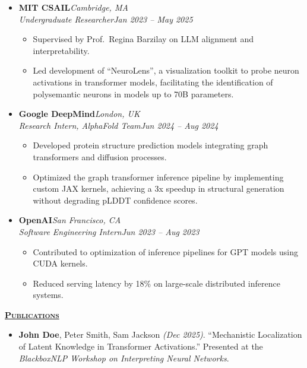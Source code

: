 \documentclass[10pt]{article}
\newcommand{\resumeSection}[1]{\noindent\uline{\textcolor{accentcolor}{\textbf{\textsc{#1}}}\hfill}\par}
\newcommand{\splitEntry}[2]{#1\hfill\textit{#2}}
\begin{document}
  \begin{itemize}
    \item {
        \splitEntry{\textbf{MIT CSAIL}}{Cambridge, MA} \\
        \splitEntry{\textit{Undergraduate Researcher}}{Jan 2023 -- May 2025}

        \begin{itemize}
          \item Supervised by Prof.\ Regina Barzilay on LLM alignment and interpretability.
          \item Led development of ``NeuroLens'', a visualization toolkit to probe neuron activations in transformer models, facilitating the identification of polysemantic neurons in models up to 70B parameters.
        \end{itemize}
    }
    \item {
      \splitEntry{\textbf{Google DeepMind}}{London, UK} \\
      \splitEntry{\textit{Research Intern, AlphaFold Team}}{Jun 2024 -- Aug 2024}

      \begin{itemize}
        \item Developed protein structure prediction models integrating graph transformers and diffusion processes.
        \item Optimized the graph transformer inference pipeline by implementing custom JAX kernels, achieving a 3x speedup in structural generation without degrading pLDDT confidence scores.
      \end{itemize}
    }
    \item {
      \splitEntry{\textbf{OpenAI}}{San Francisco, CA} \\
      \splitEntry{\textit{Software Engineering Intern}}{Jun 2023 -- Aug 2023}

      \begin{itemize}
        \item Contributed to optimization of inference pipelines for GPT models using CUDA kernels.
        \item Reduced serving latency by 18\% on large-scale distributed inference systems.
      \end{itemize}
    }
  \end{itemize}

  \resumeSection{Publications}

  \begin{itemize}
    \item {
      \textbf{John Doe}, Peter Smith, Sam Jackson \textit{(Dec 2025)}. ``Mechanistic Localization of Latent Knowledge in Transformer Activations.'' Presented at the \textit{BlackboxNLP Workshop on Interpreting Neural Networks}.
    }
  \end{itemize}
\end{document}
